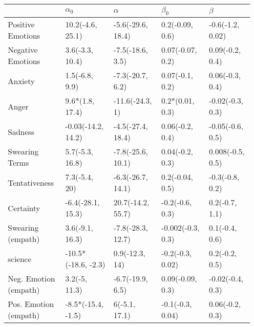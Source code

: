 \begin{tabular}{lllll}
\toprule
{} &           $\alpha_0$ &           $\alpha$ &          $\beta_0$ &           $\beta$ \\
\midrule
Positive Emotions     &     10.2(-4.6, 25.1) &  -5.6(-29.6, 18.4) &    0.2(-0.09, 0.6) &  -0.6(-1.2, 0.02) \\
Negative Emotions     &      3.6(-3.3, 10.4) &   -7.5(-18.6, 3.5) &   0.07(-0.07, 0.2) &   0.09(-0.2, 0.4) \\
Anxiety               &       1.5(-6.8, 9.9) &   -7.3(-20.7, 6.2) &    0.07(-0.1, 0.2) &   0.06(-0.3, 0.4) \\
Anger                 &      9.6*(1.8, 17.4) &    -11.6(-24.3, 1) &    0.2*(0.01, 0.3) &  -0.02(-0.3, 0.3) \\
Sadness               &   -0.03(-14.2, 14.2) &  -4.5(-27.4, 18.4) &    0.06(-0.2, 0.4) &  -0.05(-0.6, 0.5) \\
Swearing Terms        &      5.7(-5.3, 16.8) &  -7.8(-25.6, 10.1) &    0.04(-0.2, 0.3) &  0.008(-0.5, 0.5) \\
Tentativeness         &        7.3(-5.4, 20) &  -6.3(-26.7, 14.1) &    0.2(-0.04, 0.5) &   -0.3(-0.8, 0.2) \\
Certainty             &    -6.4(-28.1, 15.3) &  20.7(-14.2, 55.7) &    -0.2(-0.6, 0.3) &    0.2(-0.7, 1.1) \\
Swearing (empath)     &      3.6(-9.1, 16.3) &  -7.8(-28.3, 12.7) &  -0.002(-0.3, 0.3) &    0.1(-0.4, 0.6) \\
science               &  -10.5*(-18.6, -2.3) &     0.9(-12.3, 14) &   -0.2(-0.3, 0.02) &    0.2(-0.2, 0.5) \\
Neg. Emotion (empath) &        3.2(-5, 11.3) &   -6.7(-19.9, 6.5) &   0.09(-0.09, 0.3) &  -0.02(-0.4, 0.3) \\
Pos. Emotion (empath) &   -8.5*(-15.4, -1.5) &      6(-5.1, 17.1) &   -0.1(-0.3, 0.04) &   0.06(-0.2, 0.3) \\
\bottomrule
\end{tabular}
